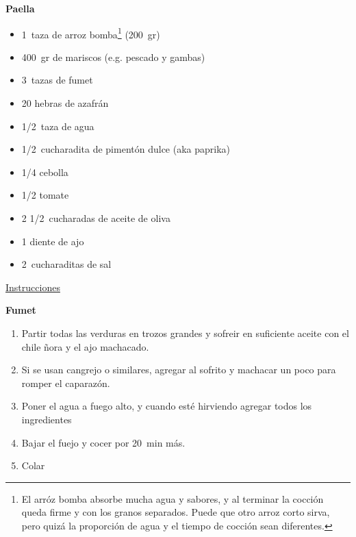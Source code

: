 \textbf{Paella}
\begin{itemize}
\item \SI{1}{taza} de arroz bomba\footnote{El arróz bomba absorbe mucha agua y sabores, y al terminar la cocción queda firme y con los granos separados. Puede que otro arroz corto sirva, pero quizá la proporción de agua y el tiempo de cocción sean diferentes.} (\SI{200}{gr})
\item \SI{400}{gr} de mariscos (e.g. pescado y gambas)
\item \SI{3}{tazas} de fumet
\item 20 hebras de azafrán
\item \SI{1/2}{taza} de agua
\item \SI{1/2}{cucharadita} de pimentón dulce (aka paprika)
\item \num{1/4} cebolla
\item \num{1/2} tomate
\item 2 \SI{1/2}{cucharadas} de aceite de oliva
\item 1 diente de ajo
\item \SI{2}{cucharaditas} de sal
\end{itemize}

\underline{Instrucciones}

\textbf{Fumet}
\begin{enumerate}
\item Partir todas las verduras en trozos grandes y sofreir en suficiente aceite con el chile ñora y el ajo machacado.
\item Si se usan cangrejo o similares, agregar al sofrito y machacar un poco para romper el caparazón.
\item Poner el agua a fuego alto, y cuando esté hirviendo agregar todos los ingredientes
\item Bajar el fuejo y cocer por \SI{20}{min} más.
\item Colar
\end{enumerate}

